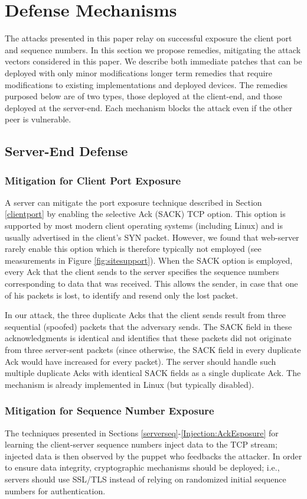 \documentclass[conference]{IEEEtran}
\begin{document}
\section{Defense Mechanisms} \label{Injection:Defenses}
The attacks presented in this paper relay on successful exposure the client port and sequence numbers. In this section we propose remedies, mitigating the attack vectors considered in this paper. We describe both immediate patches that can be deployed with only minor modifications longer term remedies that require modifications to existing implementations and deployed devices. The remedies purposed below are of two types, those deployed at the client-end, and those deployed at the server-end. Each mechanism blocks the attack even if the other peer is vulnerable. 

\subsection{Server-End Defense}

\subsubsection{Mitigation for Client Port Exposure}
A server can mitigate the port exposure technique described in Section \ref{clientport} by enabling the selective Ack (SACK) TCP option. This option is supported by most modern client operating systems (including Linux) and is usually advertised in the client's SYN packet. However, we found that web-server rarely enable this option which is therefore typically not employed (see measurements in Figure \ref{fig:sitesupport}). When the SACK option is employed, every Ack that the client sends to the server specifies the sequence numbers corresponding to data that was received. This allows the sender, in case that one of his packets is lost, to identify and resend only the lost packet. 

In our attack, the three duplicate Acks that the client sends result from three sequential (spoofed) packets that the adversary sends. The SACK field in these acknowledgments is identical and identifies that these packets did not originate from three server-sent packets (since otherwise, the SACK field in every duplicate Ack would have increased for every packet). The server should handle such multiple duplicate Acks with identical SACK fields as a single duplicate Ack. The mechanism is already implemented in Linux (but typically disabled).

\subsubsection{Mitigation for Sequence Number Exposure}
The techniques presented in Sections \ref{serverseq}-\ref{Injection:AckEsposure} for learning the client-server sequence numbers inject data to the TCP stream; injected data is then observed by the puppet who feedbacks the attacker. In order to ensure data integrity, cryptographic mechanisms should be deployed; i.e., servers should use SSL/TLS instead of relying on randomized initial sequence numbers for authentication.
\end{document}
